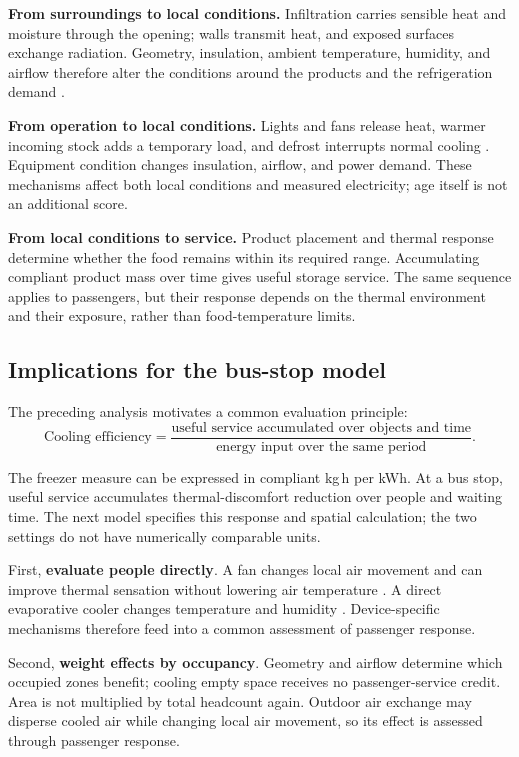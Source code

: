 \documentclass[12pt]{article}
\begin{document}
\noindent\textbf{From surroundings to local conditions.} Infiltration carries sensible heat and moisture through the opening; walls transmit heat, and exposed surfaces exchange radiation. Geometry, insulation, ambient temperature, humidity, and airflow therefore alter the conditions around the products and the refrigeration demand \cite{ashrae}.

\noindent\textbf{From operation to local conditions.} Lights and fans release heat, warmer incoming stock adds a temporary load, and defrost interrupts normal cooling \cite{ashrae}. Equipment condition changes insulation, airflow, and power demand. These mechanisms affect both local conditions and measured electricity; age itself is not an additional score.

\noindent\textbf{From local conditions to service.} Product placement and thermal response determine whether the food remains within its required range. Accumulating compliant product mass over time gives useful storage service. The same sequence applies to passengers, but their response depends on the thermal environment and their exposure, rather than food-temperature limits.

\subsection{Implications for the bus-stop model}

The preceding analysis motivates a common evaluation principle:
\begin{equation}
\boxed{\text{Cooling efficiency}
=\frac{\text{useful service accumulated over objects and time}}
{\text{energy input over the same period}}.}
\label{eq:principle}
\end{equation}

The freezer measure can be expressed in compliant kg\,h per kWh. At a bus stop, useful service accumulates thermal-discomfort reduction over people and waiting time. The next model specifies this response and spatial calculation; the two settings do not have numerically comparable units.

First, \textbf{evaluate people directly}. A fan changes local air movement and can improve thermal sensation without lowering air temperature \cite{energystar}. A direct evaporative cooler changes temperature and humidity \cite{evap}. Device-specific mechanisms therefore feed into a common assessment of passenger response.

Second, \textbf{weight effects by occupancy}. Geometry and airflow determine which occupied zones benefit; cooling empty space receives no passenger-service credit. Area is not multiplied by total headcount again. Outdoor air exchange may disperse cooled air while changing local air movement, so its effect is assessed through passenger response.
\end{document}
